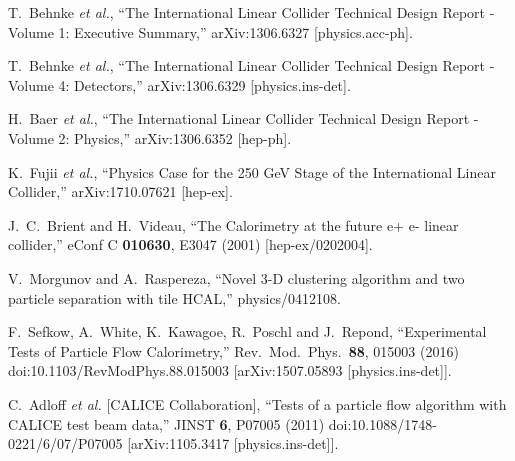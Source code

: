 \documentclass[a4paper,11pt]{article}
\begin{document}
\begin{thebibliography}{99}


  T.~Behnke {\it et al.},
  ``The International Linear Collider Technical Design Report - Volume 1: Executive Summary,''
  arXiv:1306.6327 [physics.acc-ph].
 
  T.~Behnke {\it et al.},
  ``The International Linear Collider Technical Design Report - Volume 4: Detectors,''
  arXiv:1306.6329 [physics.ins-det].

  H.~Baer {\it et al.},
  ``The International Linear Collider Technical Design Report - Volume 2: Physics,''
  arXiv:1306.6352 [hep-ph].
  
  K.~Fujii {\it et al.},
  ``Physics Case for the 250 GeV Stage of the International Linear Collider,''
  arXiv:1710.07621 [hep-ex].

  J.~C.~Brient and H.~Videau,
  ``The Calorimetry at the future e+ e- linear collider,''
  eConf C {\bf 010630}, E3047 (2001)
  [hep-ex/0202004].
  
  V.~Morgunov and A.~Raspereza,
  ``Novel 3-D clustering algorithm and two particle separation with tile HCAL,''
  physics/0412108.
  

  F.~Sefkow, A.~White, K.~Kawagoe, R.~Poschl and J.~Repond,
  ``Experimental Tests of Particle Flow Calorimetry,''
  Rev.\ Mod.\ Phys.\  {\bf 88}, 015003 (2016)
  doi:10.1103/RevModPhys.88.015003
  [arXiv:1507.05893 [physics.ins-det]].
 
  C.~Adloff {\it et al.} [CALICE Collaboration],
  ``Tests of a particle flow algorithm with CALICE test beam data,''
  JINST {\bf 6}, P07005 (2011)
  doi:10.1088/1748-0221/6/07/P07005
  [arXiv:1105.3417 [physics.ins-det]].
  

\end{thebibliography}
\end{document}
